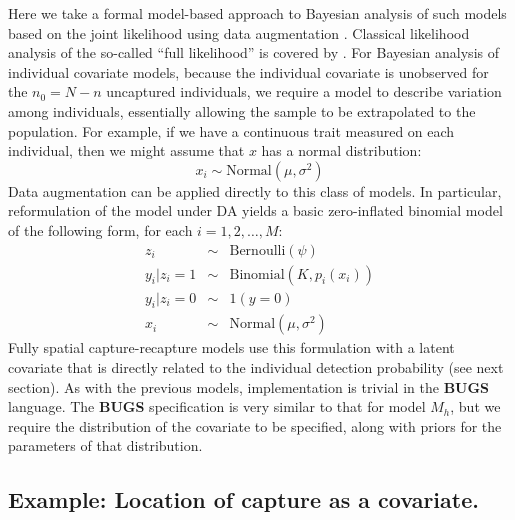 Here we take a formal model-based approach to Bayesian analysis of
such models based on the joint likelihood using data augmentation
\citep{royle:2009}. Classical likelihood analysis of the so-called
``full likelihood'' is covered by \citet{borchers_etal:2002}.  For
Bayesian analysis of individual covariate models, because the
individual covariate is unobserved for the $n_{0} = N-n$ uncaptured
individuals, we require a model to describe variation among
individuals, essentially allowing the sample to be extrapolated to the
population.  For example, if we have a continuous trait measured on
each individual, then we might assume that $x$ has a normal distribution:
\[
x_{i} \sim \mbox{Normal}(\mu,\sigma^{2})
\]
Data augmentation can be applied directly to this class of models. In
particular, reformulation of the model under DA yields a basic
zero-inflated binomial model of the following form, for each
$i=1,2,\ldots, M$:
\begin{eqnarray*}
z_{i} &\sim& \mbox{Bernoulli}(\psi)  \\
y_{i}|{z_{i}\! =\! 1} &\sim& \mbox{Binomial}(K,p_{i}(x_{i})) \\
y_{i} |{ z_{i}\! =\! 0} &\sim& 1(y=0)  \\
x_{i} & \sim & \mbox{Normal}(\mu,\sigma^{2})
\end{eqnarray*}
Fully spatial capture-recapture models use this formulation with a
latent covariate that is directly related to the individual detection
probability (see next section). As with the previous models,
implementation is trivial in the {\bf BUGS} language. The {\bf BUGS}
specification is very similar to that for model $M_h$, but we require
the distribution of the covariate to be specified, along with priors
for the parameters of that distribution.


\subsection{Example: Location of capture as a covariate.}

